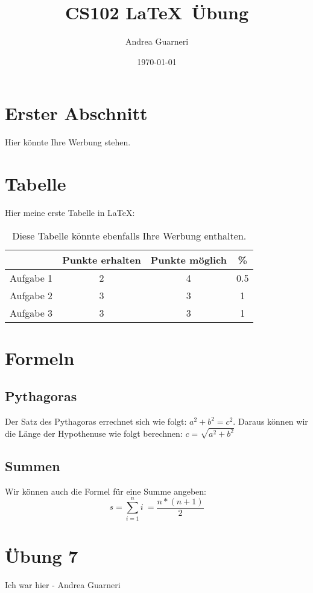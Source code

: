 \documentclass{article}
\begin{document}
\title{CS102 \LaTeX  \, Übung}
\author{Andrea Guarneri}
\date{\today}
\maketitle

\section{Erster Abschnitt}
Hier könnte Ihre Werbung stehen.

\section{Tabelle}
Hier meine erste Tabelle in \LaTeX : \\
\begin{table}[h]
\centering
\begin{tabular}{c|c|c|c}
& Punkte erhalten & Punkte möglich & \% \\
 \hline Aufgabe 1 & 2 & 4 & 0.5 \\
 Aufgabe 2 & 3 & 3 & 1 \\
 Aufgabe 3 & 3 & 3 & 1 \\
 \end{tabular}
 
\caption{Diese Tabelle könnte ebenfalls Ihre Werbung enthalten.}
\end{table}

\section{Formeln}
\subsection{Pythagoras}
Der Satz des Pythagoras errechnet sich wie folgt: $a^2 + b^2 = c^2 $. Daraus können wir die Länge der Hypothenuse wie folgt berechnen: $c = \sqrt{a^2+b^2}$

\subsection{Summen}
Wir können auch die Formel für eine Summe angeben:
\begin{equation}
s = \sum_{i=1}^n i\ = \frac{n*(n+1)}{2}
\end{equation}
\section{Übung 7}
Ich war hier - Andrea Guarneri
\end{document}
